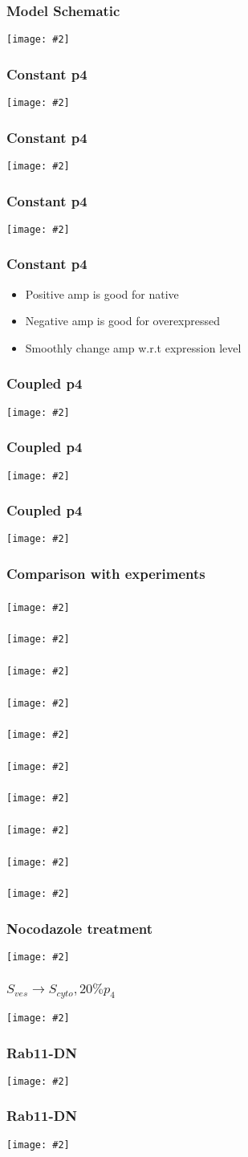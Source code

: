 \documentclass{beamer}
\newcommand{\plotslide}[2]{
  \begin{frame}
    \frametitle{#1}
    \centering
    \texttt{[image: \#2]}
  \end{frame}
}
\begin{document}
\plotslide{Model Schematic}{../tikz/flow.pdf}
\plotslide{Constant p4}{constant_p4_func.pdf}
\plotslide{Constant p4}{p4a_sign_change_Sves.pdf}
\plotslide{Constant p4}{p4a_sign_change_MI.pdf}

\begin{frame}
  \frametitle{Constant p4}
  \begin{itemize}
    \item Positive amp is good for native
    \item Negative amp is good for overexpressed
    \item Smoothly change amp w.r.t expression level
  \end{itemize}
\end{frame}

\plotslide{Coupled p4}{coupled_p4_func.pdf}
\plotslide{Coupled p4}{Sves_coupled_p4.pdf}
\plotslide{Coupled p4}{MI_coupled_p4.pdf}


\begin{frame}
  \frametitle{Comparison with experiments}
\end{frame}

\plotslide{}{StotVsMAPKpp.pdf}

\plotslide{}{SmemVsp3.pdf}

\plotslide{}{../hao/dose_response_ERK_t.png}
\plotslide{}{InputVsMAPKpp.pdf}

\plotslide{}{../hao/dose_response_MI_t.png}
\plotslide{}{InputVsMI.pdf}

\plotslide{}{../hao/exp-MIvsS_t.png}
\plotslide{}{ScaffoldVsMAPKppMI.pdf}

\plotslide{}{../hao/gradient_response_t.png}
\plotslide{}{GradientVsMI.pdf}

\plotslide{Nocodazole treatment}{../hao/noco_t.png}
\plotslide{$S_{ves} \rightarrow S_{cyto}, 20\%  p_4 $}{noco.pdf}

\plotslide{Rab11-DN}{../hao/Rab11DN_t.png}
\plotslide{Rab11-DN}{rab11dn.pdf}

\end{document}
